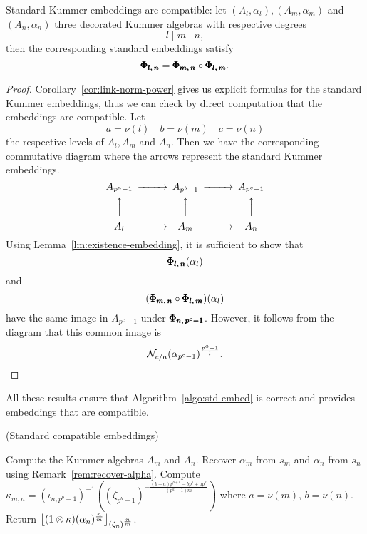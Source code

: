 \begin{prop}
  \label{prop:embeddings-compatibility}
  Standard Kummer embeddings are compatible: let $(A_l, \alpha_l), (A_m,
  \alpha_m)$ and $(A_n, \alpha_n)$ three decorated Kummer algebras with
  respective degrees
  \[
    l\mid m\mid n,
  \]
  then the corresponding standard embeddings satisfy
  \[
    \pmb{\Phi_{{l},\,{n}}} = \pmb{\Phi_{{m},\,{n}}}\circ\pmb{\Phi_{{l},\,{m}}}.
  \]
\end{prop}
\begin{proof}
  Corollary~\ref{cor:link-norm-power} gives us explicit formulas for the
  standard Kummer embeddings, thus we can check by direct computation that the
  embeddings are compatible. Let
  \[
    a = \nu(l)\quad b =\nu(m)\quad c = \nu(n)
  \]
  the respective levels of $A_l, A_m$ and $A_n$. Then we have the corresponding
  commutative diagram where the arrows represent the standard Kummer embeddings.
 \begin{equation*}
\begin{CD}
A_{p^a-1} @>>> A_{p^b-1} @>>> A_{p^c-1} \\
@AAA @AAA @AAA\\
A_l @>>> A_m @>>> A_n
\end{CD}
\end{equation*} 
Using Lemma~\ref{lm:existence-embedding}, it is sufficient to show that
\[
  \pmb{\Phi_{{l},\,{n}}}(\alpha_l)
\]
and
\[
  (\pmb{\Phi_{{m},\,{n}}}\circ\pmb{\Phi_{{l},\,{m}}})(\alpha_l)
\]
have the same image in $A_{p^c-1}$ under $\pmb{\Phi_{{n},\,{p^c-1}}}$. However, it
follows from the diagram that this common image is 
\[
  \mathcal{N}_{c/a}(\alpha_{p^c-1})^{\frac{p^a-1}{l}}.
\]
\end{proof}
All these results ensure that Algorithm~\ref{algo:std-embed} is correct and
provides embeddings that are compatible.
\begin{algorithm}
  \caption{(Standard compatible embeddings)}
  \label{algo:std-embed}
  \begin{algorithmic}[1]
  \State Compute the Kummer algebras $A_m$ and $A_n$.
  \State Recover $\alpha_m$ from $s_m$ and $\alpha_n$ from $s_n$ using
  Remark~\ref{rem:recover-alpha}.%
  \State Compute
  $\kappa_{m,n}=(\iota_{n,p^b-1})^{-1}\left((\zeta_{p^b-1})^{-\frac{(b-a)p^{b+a}-bp^b+ap^a}{(p^a-1)m}}\right)$
  where $a=\nu(m)$, $b=\nu(n)$.
  \State Return
  $\left\lfloor (1\otimes\kappa)(\alpha_n)^{\frac{n}{m}} \right\rfloor_{(\zeta_n)^{\frac{n}{m}}}$.
  \end{algorithmic}
\end{algorithm}
